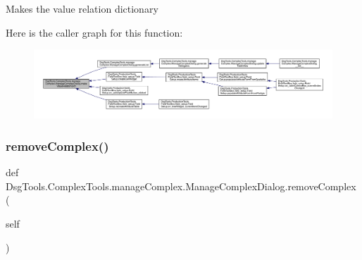 \begin{DoxyVerb}Makes the value relation dictionary
\end{DoxyVerb}
 Here is the caller graph for this function\+:
\nopagebreak
\begin{figure}[H]
\begin{center}
\leavevmode
\includegraphics[width=350pt]{class_dsg_tools_1_1_complex_tools_1_1manage_complex_1_1_manage_complex_dialog_ad7cddc5c0c4e2588da86d65c5baee3ee_icgraph}
\end{center}
\end{figure}
\mbox{\label{class_dsg_tools_1_1_complex_tools_1_1manage_complex_1_1_manage_complex_dialog_af4f067c0ad67781741a72f58d7732469}} 
\subsubsection{\texorpdfstring{remove\+Complex()}{removeComplex()}}
{\footnotesize\ttfamily def Dsg\+Tools.\+Complex\+Tools.\+manage\+Complex.\+Manage\+Complex\+Dialog.\+remove\+Complex (\begin{DoxyParamCaption}\item[{}]{self }\end{DoxyParamCaption})}

